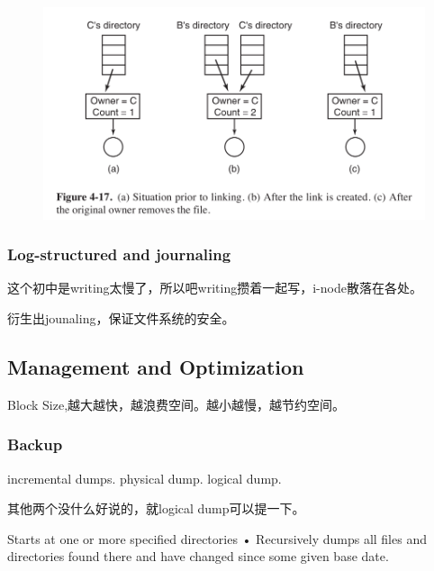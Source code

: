 \documentclass[a4paper]{article}
\begin{document}
\begin{figure}
  \centering
  \includegraphics{staticlink.png}
  \caption{}
  \label{staticlink}
\end{figure}

\subsubsection {Log-structured and journaling}
这个初中是writing太慢了，所以吧writing攒着一起写，i-node散落在各处。

衍生出jounaling，保证文件系统的安全。

\subsection{Management and Optimization}
Block Size,越大越快，越浪费空间。越小越慢，越节约空间。

\subsubsection{Backup}
incremental dumps. physical dump. logical dump.

其他两个没什么好说的，就logical dump可以提一下。

\begin{qutoe}
  Starts at one or more specified
directories
• Recursively dumps all files and
directories found there and have
changed since some given base date.
\end{qutoe}
\nocite{*}
% 
\end{document}
